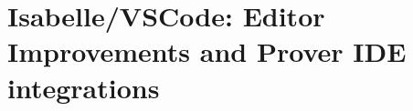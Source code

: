 
\chapter{Isabelle/VSCode: Editor Improvements and Prover IDE integrations}
\label{chapter:implementation}



